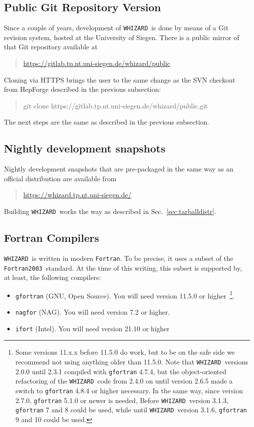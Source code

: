 \documentclass[12pt]{book}
\newcommand{\ttt}[1]{\texttt{#1}}
\newcommand{\whizard}{\ttt{WHIZARD}}
\newcommand{\fortran}{\ttt{Fortran}}
\newcommand{\fortranOThree}{\ttt{Fortran2003}}
\begin{document}

\subsection{Public Git Repository Version}

Since a couple of years, development of \whizard\ is done by means of
a Git revision system, hosted at the University of Siegen. There is a
public mirror of that Git repository available at
\begin{quote}
  \url{https://gitlab.tp.nt.uni-siegen.de/whizard/public}
\end{quote}
Cloning via HTTPS brings the user to the same change as the SVN
checkout from HepForge described in the previous subsection:
\begin{quote}
  git clone https://gitlab.tp.nt.uni-siegen.de/whizard/public.git
\end{quote}
The next steps are the same as described in the previous subsection.


\subsection{Nightly development snapshots}

Nightly development snapshots that are pre-packaged in the same way
as an official distribution are available from
\begin{quote}
  \url{https://whizard.tp.nt.uni-siegen.de/}
\end{quote}
Building \whizard\ works the way as described in
Sec.~\ref{sec:tarballdistr}.



\subsection{\label{sec:compilers}Fortran Compilers}

\whizard\ is written in modern \fortran.  To be precise, it uses a
subset of the \fortranOThree\ standard.  At the time of this writing,
this subset is supported by, at least, the following compilers:
\begin{itemize}
\item
  \ttt{gfortran} (GNU, Open Source).  You will need version 11.5.0
  or higher~\footnote{Some versions 11.x.x before 11.5.0 do work, but
  to be on the safe side we recommend not using anything older than
  11.5.0. Note that \whizard\ versions 2.0.0 until 2.3.1 compiled 
  with \ttt{gfortran} 4.7.4, but the object-oriented
  refactoring of the \whizard\ code from 2.4.0 on until version 2.6.5
  made a switch to \ttt{gfortran} 4.8.4 or higher necessary. In the
  same way, since version 2.7.0, \ttt{gfortran} 5.1.0 or newer is
  needed, Before \whizard\ version 3.1.3, \ttt{gfortran} 7 and 8
  could be used, while until \whizard\ version 3.1.6, \ttt{gfortran}
  9 and 10 could be used.}. 
\item
  \ttt{nagfor} (NAG).  You will need version 7.2 or higher.
\item
  \ttt{ifort} (Intel). You will need version 21.10 or
  higher
\end{itemize}
\end{document}
